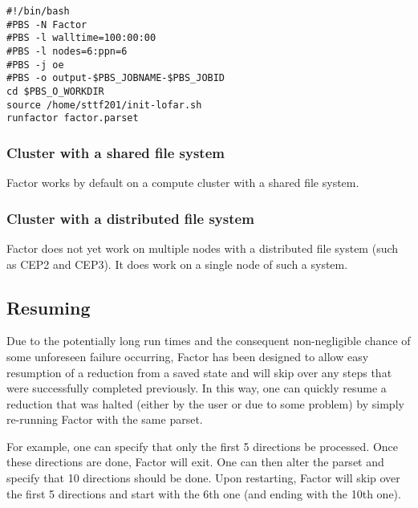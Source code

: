 \documentclass[structabstract]{article}
\begin{document}
\begin{verbatim}
#!/bin/bash
#PBS -N Factor
#PBS -l walltime=100:00:00
#PBS -l nodes=6:ppn=6
#PBS -j oe
#PBS -o output-$PBS_JOBNAME-$PBS_JOBID
cd $PBS_O_WORKDIR
source /home/sttf201/init-lofar.sh
runfactor factor.parset
\end{verbatim}

\subsubsection{Cluster with a shared file system}
Factor works by default on a compute cluster with a shared file system.

\subsubsection{Cluster with a distributed file system}
Factor does not yet work on multiple nodes with a distributed file system (such
as CEP2 and CEP3). It does work on a single node of such a system.


\subsection{Resuming}
\label{factor:resuming}

Due to the potentially long run times and the consequent non-negligible chance
of some unforeseen failure occurring, Factor has been designed to allow easy
resumption of a reduction from a saved state and will skip over any steps that
were successfully completed previously. In this way, one can quickly resume a
reduction that was halted (either by the user or due to some problem) by simply
re-running Factor with the same parset.

For example, one can specify that only the first 5 directions be processed.
Once these directions are done, Factor will exit. One can then alter the parset
and specify that 10 directions should be done. Upon restarting, Factor will skip
over the first 5 directions and start with the 6th one (and ending with the 10th
one).


\end{document}
